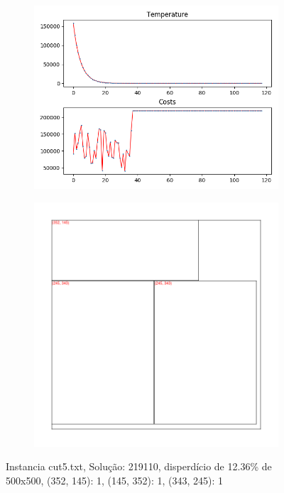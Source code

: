 \begin{figure}
\centering
\begin{subfigure}{.5\textwidth}
  \centering
  \includegraphics[width=1\linewidth]{results/cut5/2/plot}
  \label{fig:sub1}
\end{subfigure}%
\begin{subfigure}{.5\textwidth}
  \centering
  \includegraphics[width=1\linewidth]{results/cut5/2/cut}
  \label{fig:sub2}
\end{subfigure}
\caption{Instancia cut5.txt, Solução: 219110, disperdício de 12.36\% de 500x500, {(352, 145): 1, (145, 352): 1, (343, 245): 1}}
\label{fig:test}
\end{figure}


